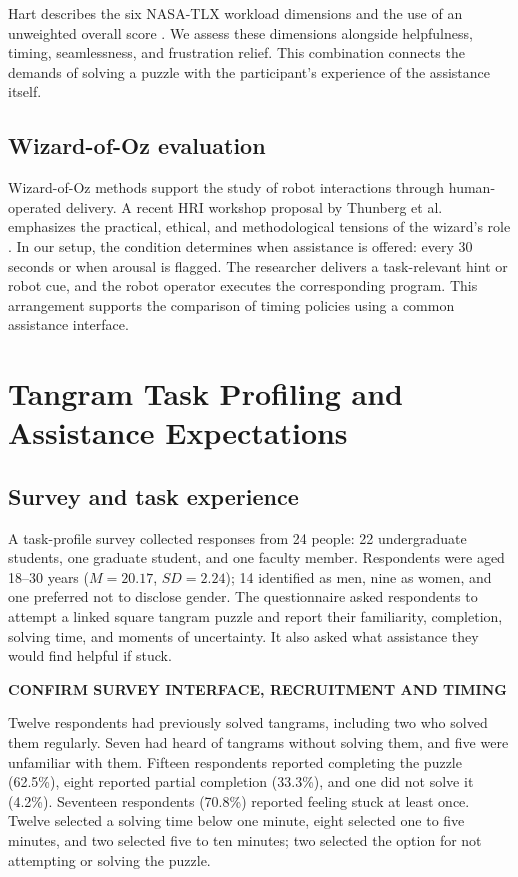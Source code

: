 \documentclass[sigconf]{aamas}
\begin{document}
Hart describes the six NASA-TLX workload dimensions and the use of an unweighted overall score \cite{hart2006}. We assess these dimensions alongside helpfulness, timing, seamlessness, and frustration relief. This combination connects the demands of solving a puzzle with the participant's experience of the assistance itself.

\subsection{Wizard-of-Oz evaluation}

Wizard-of-Oz methods support the study of robot interactions through human-operated delivery. A recent HRI workshop proposal by Thunberg et al. emphasizes the practical, ethical, and methodological tensions of the wizard's role \cite{thunberg2026}. In our setup, the condition determines when assistance is offered: every 30 seconds or when arousal is flagged. The researcher delivers a task-relevant hint or robot cue, and the robot operator executes the corresponding program. This arrangement supports the comparison of timing policies using a common assistance interface.

\section{Tangram Task Profiling and Assistance Expectations}

\subsection{Survey and task experience}

A task-profile survey collected responses from 24 people: 22 undergraduate students, one graduate student, and one faculty member. Respondents were aged 18--30 years ($M=20.17$, $SD=2.24$); 14 identified as men, nine as women, and one preferred not to disclose gender. The questionnaire asked respondents to attempt a linked square tangram puzzle and report their familiarity, completion, solving time, and moments of uncertainty. It also asked what assistance they would find helpful if stuck.

\textbf{CONFIRM SURVEY INTERFACE, RECRUITMENT AND TIMING}

Twelve respondents had previously solved tangrams, including two who solved them regularly. Seven had heard of tangrams without solving them, and five were unfamiliar with them. Fifteen respondents reported completing the puzzle (62.5\%), eight reported partial completion (33.3\%), and one did not solve it (4.2\%). Seventeen respondents (70.8\%) reported feeling stuck at least once. Twelve selected a solving time below one minute, eight selected one to five minutes, and two selected five to ten minutes; two selected the option for not attempting or solving the puzzle.
\end{document}
